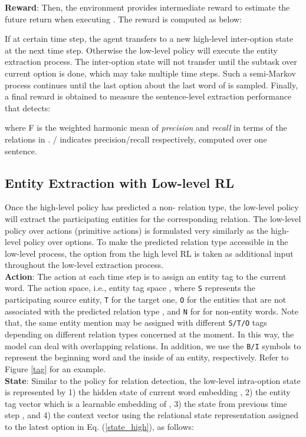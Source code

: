 \documentclass[letterpaper]{article} \usepackage{aaai19}  \usepackage{times}  \usepackage{helvet}  \usepackage{courier}  \usepackage{url}  \usepackage{graphicx}  \frenchspacing  \setlength{\pdfpagewidth}{8.5in}  \setlength{\pdfpageheight}{11in}  \usepackage{amsfonts}
\theoremstyle{definition}
\begin{document}
\textbf{Reward}: Then, the environment provides intermediate reward  to estimate the future return when executing . The reward is computed as below:

If  at certain time step, the agent transfers to a new high-level inter-option state at the next time step. Otherwise the low-level policy will execute the entity extraction process. The inter-option state will not transfer until the subtask over current option  is done, which may take multiple time steps. Such a semi-Markov process continues until the last option about the last word  of  is sampled. Finally, a final reward  is obtained to measure the sentence-level extraction performance that  detects:

where F is the weighted harmonic mean of {\it precision} and {\it recall} in terms of the relations in . / indicates precision/recall respectively, computed over one sentence.


\subsection{Entity Extraction with Low-level RL}
Once the high-level policy has predicted a non- relation type, the low-level policy  will extract the participating entities for the corresponding relation. The low-level policy over actions (primitive actions) is formulated very similarly as the high-level policy over options. To make the predicted relation type accessible in the low-level process, the option  from the high level RL is taken as additional input throughout the low-level extraction process. 
\\
\textbf{Action}: The action at each time step is to assign an entity tag to the current word. The action space, i.e., entity tag space , where \texttt{S} represents the participating source entity, \texttt{T} for the target one, \texttt{O} for the entities that are not associated with the predicted relation type , and \texttt{N} for for non-entity words. Note that, the same entity mention may be assigned with different \texttt{S/T/O} tags depending on different relation types concerned at the moment. In this way, the model can deal with overlapping relations.
In addition, we use the \texttt{B/I} symbols to represent the beginning word and the inside of an entity, respectively. Refer to Figure \ref{tag} for an example. 
\\
\textbf{State}: Similar to the policy for relation detection, the low-level intra-option state  is represented by 1) the hidden state  of current word embedding , 2) the entity tag vector  which is a learnable embedding of , 3) the state from previous time step , and 4) the context vector  using the relational state representation assigned to the latest option  in Eq. (\ref{state_high}), as follows:
\end{document}
